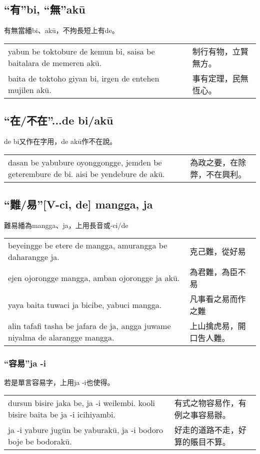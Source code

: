 \documentclass{article}
\begin{document}
\subsection{“有”bi, “無”ak\={u}}
\noindent 有無當繙bi、ak\={u}，不拘長短上有de。
\begin{center}
    \begin{tabularx}{\textwidth}{XX}
        yabun be toktobure de kemun bi, saisa be baitalara de memeren ak\={u}. & 制行有物，立賢無方。\\
        baita de toktoho giyan bi, irgen de entehen mujilen ak\={u}. & 事有定理，民無恆心。
    \end{tabularx}
\end{center}

\subsection{“在/不在”...de bi/ak\={u}}
\noindent de bi又作在字用，de ak\={u}作不在說。
\begin{center}
    \begin{tabularx}{\textwidth}{XX}
        dasan be yabubure oyonggongge, jemden be geterembure de bi. aisi be yendebure de ak\={u}. & 為政之要，在除弊，不在興利。
    \end{tabularx}
\end{center}

\subsection{“難/易”[V-ci, de] mangga, ja}
\noindent 難易繙為mangga、ja，上用長音或-ci/de
\begin{center}
    \begin{tabularx}{\textwidth}{XX}
        beyeingge be etere de mangga, amurangga be daharangge ja. & 克己難，從好易\\
        ejen ojorongge mangga, amban ojorongge ja ak\={u}. & 為君難，為臣不易\\
        yaya baita tuwaci ja bicibe, yabuci mangga. & 凡事看之易而作之難\\
        alin tafafi tasha be jafara de ja, angga juwame niyalma de alarangge mangga. & 上山擒虎易，開口吿人難。
    \end{tabularx}
\end{center}

\subsubsection{“容易”ja -i}
\noindent 若是單言容易字，上用ja -i也使得。
\begin{center}
    \begin{tabularx}{\textwidth}{XX}
        dursun bisire jaka be, ja -i weilembi. kooli bisire baita be ja -i icihiyambi.& 有式之物容易作，有例之事容易辦。\\
        ja -i yabure jug\={u}n be yaburak\={u}, ja -i bodoro boje be bodorak\={u}. & 好走的道路不走，好算的賬目不算。
    \end{tabularx}
\end{center}
\end{document}
